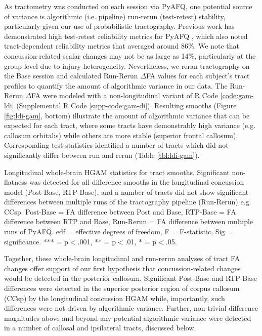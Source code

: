 \documentclass[12pt]{article}
\begin{document}
As tractometry was conducted on each session via PyAFQ, one potential source of variance is algorithmic (i.e. pipeline) run-rerun (test-retest) stability, particularly given our use of probabilistic tractography. Previous work has demonstrated high test-retest reliability metrics for PyAFQ \parencite{kruper2021EvaluatingReliabilityHuman}, which also noted tract-dependent reliability metrics that averaged around 86\%. We note that concussion-related scalar changes may not be as large as 14\%, particularly at the group level due to injury heterogeneity. Nevertheless, we reran tractography on the Base session and calculated Run-Rerun $\Delta$FA values for each subject's tract profiles to quantify the amount of algorithmic variance in our data. The Run-Rerun $\Delta$FA were modeled with a non-longitudinal variant of R Code \ref{code:gam-ldi} (Supplemental R Code \ref{supp-code:gam-di}). Resulting smooths (Figure \ref{fig:ldi-gam}, bottom) illustrate the amount of algorithmic variance that can be expected for each tract, where some tracts have demonstrably high variance (e.g. callosum orbitalis) while others are more stable (superior frontal callosum). Corresponding test statistics identified a number of tracts which did not significantly differ between run and rerun (Table \ref{tbl:ldi-gam}).

\begin{table}[H]
	\scriptsize
	
	\caption{Longitudinal whole-brain HGAM statistics for tract smooths. Significant non-flatness was detected for all difference smooths in the longitudinal concussion model (Post-Base, RTP-Base), and a number of tracts did not show significant differences between multiple runs of the tractography pipeline (Run-Rerun) e.g. CCsp. Post-Base = FA difference between Post and Base, RTP-Base = FA difference between RTP and Base, Run-Rerun = FA difference between multiple runs of PyAFQ. edf = effective degrees of freedom, F = F-statistic, Sig = significance. *** = p$<$.001, ** = p$<$.01, * = p$<$.05.}
	\label{tbl:ldi-gam}
\end{table}

Together, these whole-brain longitudinal and run-rerun analyses of tract FA changes offer support of our first hypothesis that concussion-related changes would be detected in the posterior callosum. Significant Post-Base and RTP-Base differences were detected in the superior posterior region of corpus callosum (CCsp) by the longitudinal concussion HGAM while, importantly, such differences were not driven by algorithmic variance. Further, non-trivial difference magnitudes above and beyond any potential algorithmic variance were detected in a number of callosal and ipsilateral tracts, discussed below.
\end{document}
